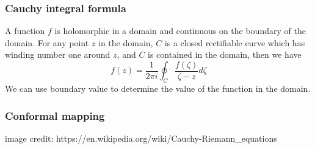 \documentclass[aspectratio=169]{beamer}
\begin{document}
\begin{frame}
    \frametitle{Cauchy integral formula}
    A function $f$ is holomorphic in a domain and continuous on the boundary of the domain.
    For any point $z$ in the domain, $C$ is a closed rectifiable curve which has winding number one around $z$,
    and $C$ is contained in the domain, then we have
    \[
        f(z) = \frac{1}{2 \pi i} \oint_{C} \frac{f(\zeta)}{\zeta - z} d\zeta
    \]
    We can use boundary value to determine the value of the function in the domain.
\end{frame}

\begin{frame}
    \frametitle{Conformal mapping}
    \begin{figure}[ht]\centering
    \end{figure}
    \small{image credit: https://en.wikipedia.org/wiki/Cauchy-Riemann\_equations}
\end{frame}
\end{document}
